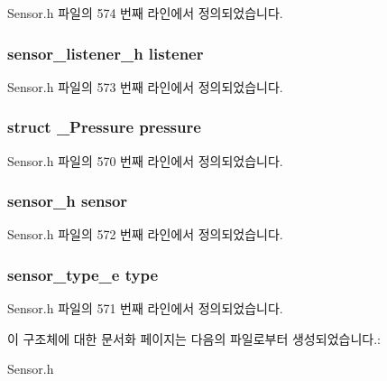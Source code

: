 Sensor.\-h 파일의 574 번째 라인에서 정의되었습니다.

\hypertarget{struct__PressureExtend_aa977dfb866b24fd7d9a20a9a01b2fd1f}{
\subsubsection[{listener}]{\setlength{\rightskip}{0pt plus 5cm}sensor\-\_\-listener\-\_\-h listener}}\label{struct__PressureExtend_aa977dfb866b24fd7d9a20a9a01b2fd1f}


Sensor.\-h 파일의 573 번째 라인에서 정의되었습니다.

\hypertarget{struct__PressureExtend_a9dba4e614ab2adf5a3ffa8d5bb899412}{
\subsubsection[{pressure}]{\setlength{\rightskip}{0pt plus 5cm}struct {\bf \-\_\-\-Pressure} pressure}}\label{struct__PressureExtend_a9dba4e614ab2adf5a3ffa8d5bb899412}


Sensor.\-h 파일의 570 번째 라인에서 정의되었습니다.

\hypertarget{struct__PressureExtend_a5bae9b7801bc3808411925cde81d3f26}{
\subsubsection[{sensor}]{\setlength{\rightskip}{0pt plus 5cm}sensor\-\_\-h sensor}}\label{struct__PressureExtend_a5bae9b7801bc3808411925cde81d3f26}


Sensor.\-h 파일의 572 번째 라인에서 정의되었습니다.

\hypertarget{struct__PressureExtend_abffb09766da2fc510a79bb51f82a36e1}{
\subsubsection[{type}]{\setlength{\rightskip}{0pt plus 5cm}sensor\-\_\-type\-\_\-e type}}\label{struct__PressureExtend_abffb09766da2fc510a79bb51f82a36e1}


Sensor.\-h 파일의 571 번째 라인에서 정의되었습니다.



이 구조체에 대한 문서화 페이지는 다음의 파일로부터 생성되었습니다.\-:\begin{DoxyCompactItemize}
\item 
Sensor.\-h\end{DoxyCompactItemize}
